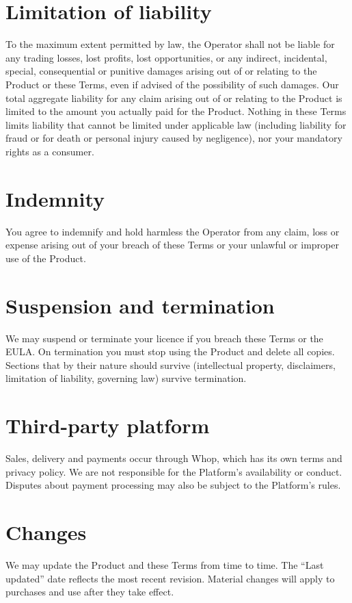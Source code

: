 \documentclass[11pt,a4paper]{article}
\begin{document}
\section{Limitation of liability}
To the maximum extent permitted by law, the Operator shall not be liable for any trading losses,
lost profits, lost opportunities, or any indirect, incidental, special, consequential or punitive
damages arising out of or relating to the Product or these Terms, even if advised of the possibility
of such damages. Our total aggregate liability for any claim arising out of or relating to the
Product is limited to the amount you actually paid for the Product. Nothing in these Terms limits
liability that cannot be limited under applicable law (including liability for fraud or for death or
personal injury caused by negligence), nor your mandatory rights as a consumer.

\section{Indemnity}
You agree to indemnify and hold harmless the Operator from any claim, loss or expense arising out of
your breach of these Terms or your unlawful or improper use of the Product.

\section{Suspension and termination}
We may suspend or terminate your licence if you breach these Terms or the EULA. On termination you
must stop using the Product and delete all copies. Sections that by their nature should survive
(intellectual property, disclaimers, limitation of liability, governing law) survive termination.

\section{Third-party platform}
Sales, delivery and payments occur through Whop, which has its own terms and privacy policy. We are
not responsible for the Platform's availability or conduct. Disputes about payment processing may
also be subject to the Platform's rules.

\section{Changes}
We may update the Product and these Terms from time to time. The ``Last updated'' date reflects the
most recent revision. Material changes will apply to purchases and use after they take effect.
\end{document}
